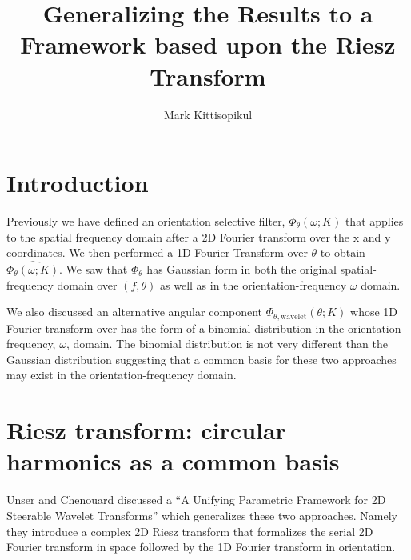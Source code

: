 \documentclass{article}
\title{Generalizing the Results to a Framework based upon the Riesz Transform}
\author{Mark Kittisopikul}
\begin{document}
\maketitle

\section{Introduction}
Previously we have defined an orientation selective filter, $ \Phi_\theta(\omega; K) $ that applies to the spatial frequency domain after a 2D Fourier transform over the x and y coordinates. We then performed a 1D Fourier Transform over $ \theta $ to obtain $ \widehat{\Phi_\theta(\omega; K)} $. We saw that $ \Phi_\theta $ has Gaussian form in both the original spatial-frequency domain over $ (f,\theta) $ as well as in the orientation-frequency $ \omega $ domain.

We also discussed an alternative angular component $ \Phi_{\theta,\mbox{wavelet}}(\theta; K) $ whose 1D Fourier transform over has the form of a binomial distribution in the orientation-frequency, $ \omega $, domain. The binomial distribution is not very different than the Gaussian distribution suggesting that a common basis for these two approaches may exist in the orientation-frequency domain.

\section{Riesz transform: circular harmonics as a common basis}

Unser and Chenouard discussed a ``A Unifying Parametric Framework for 2D Steerable Wavelet Transforms'' which generalizes these two approaches. Namely they introduce a complex 2D Riesz transform that formalizes the serial 2D Fourier transform in space followed by the 1D Fourier transform in orientation.
\end{document}
